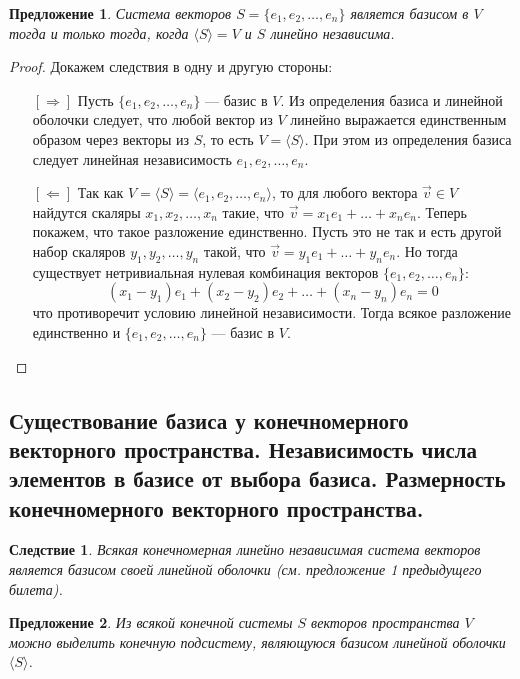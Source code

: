 \documentclass[a4paper, 12pt]{article}
\newtheorem{base_44}{Предложение}
\newtheorem*{base_44-cons}{Следствие}
\begin{document}
\begin{base_44}
Система векторов $S = \{e_1, e_2, \ldots, e_n\}$ является базисом в $V$ тогда и только тогда, когда $\langle S \rangle = V$ и $S$ линейно независима.
\end{base_44}
\begin{proof} Докажем следствия в одну и другую стороны:
\begin{itemize}
\item[{$[\Rightarrow]$}] Пусть $\{e_1, e_2, \ldots, e_n\}$ --- базис в $V$. Из определения базиса и линейной оболочки следует, что любой вектор из $V$ линейно выражается единственным образом через векторы из $S$, то есть $V = \langle S \rangle$. При этом из определения базиса следует линейная независимость $e_1, e_2, \ldots, e_n$.

\item[{$[\Leftarrow]$}] Так как $V = \langle S \rangle = \langle e_1, e_2, \ldots, e_n \rangle$, то для любого вектора $\vec{v} \in V$ найдутся скаляры $x_1, x_2, \ldots, x_n$ такие, что $\vec{v} = x_1e_1 + \ldots + x_ne_n$. Теперь покажем, что такое разложение единственно. Пусть это не так и есть другой набор скаляров $y_1, y_2, \ldots, y_n$ такой, что $\vec{v} = y_1e_1 + \ldots + y_ne_n$. Но тогда существует нетривиальная нулевая комбинация векторов $\{e_1, e_2, \ldots, e_n\}$:
\[(x_1 - y_1)e_1 + (x_2 - y_2)e_2 + \ldots + (x_n - y_n)e_n = 0\]
что противоречит условию линейной независимости. Тогда всякое разложение единственно и $\{e_1, e_2, \ldots, e_n\}$ --- базис в $V$.
\end{itemize}
\end{proof}


\subsection{Существование базиса у конечномерного векторного пространства. Независимость числа элементов в базисе от выбора базиса. Размерность конечномерного векторного пространства.}

\begin{base_44-cons}
Всякая конечномерная линейно независимая система векторов является базисом своей линейной оболочки (см. предложение 1 предыдущего билета).
\end{base_44-cons}

\begin{base_44}
Из всякой конечной системы $S$ векторов пространства $V$ можно выделить конечную подсистему, являющуюся базисом линейной оболочки $\langle S \rangle$.
\end{base_44}
\end{document}
